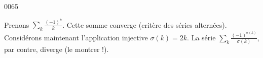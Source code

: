
\begin{corrige}{0065}

Prenons $\sum_k\frac{ (-1)^k }{ k }$. Cette somme converge (critère des séries alternées). Considérons maintenant l'application injective $\sigma(k)=2k$. La série $\sum_k\frac{ (-1)^{\sigma(k)} }{ \sigma(k) }$, par contre, diverge (le montrer !).

\end{corrige}
